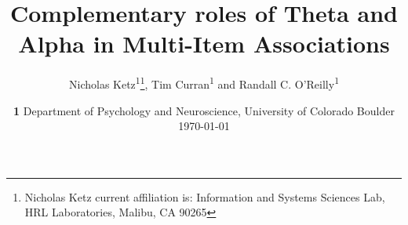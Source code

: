 \documentclass[11pt, titlepage, twoside]{article}
\begin{document}
\title{Complementary roles of Theta and Alpha in Multi-Item Associations}
\author{Nicholas Ketz\textsuperscript{1}\footnote{Nicholas Ketz current affiliation is: Information and Systems Sciences Lab, HRL Laboratories, Malibu, CA 90265}, Tim Curran\textsuperscript{1} and Randall C. O'Reilly\textsuperscript{1}}
\date{
	\textbf{1} Department of Psychology and Neuroscience, University of Colorado Boulder  
	 \\
	\today
}

\maketitle


\end{document}
